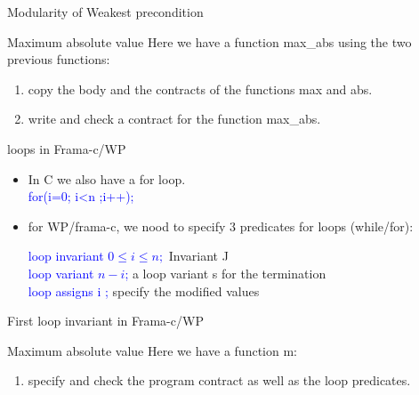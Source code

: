 \begin{frame}{Modularity of Weakest precondition}
\begin{exampleblock}{Maximum absolute value}
	Here we have a function max\_abs using the two previous functions:
	
	\begin{enumerate}
		\item copy the body and the contracts of the functions max and abs.
		\item write and check a contract for the function max\_abs.
		
	\end{enumerate}
\end{exampleblock}
\end{frame}

\begin{frame}{loops in Frama-c/WP}
\begin{itemize}
	\item In C we also have a for loop.\\
	\textcolor{blue}{for(i=0; i<n ;i++);}
    \item for WP/frama-c, we nood to specify 3 predicates for loops (while/for):
    
    	 \textcolor{blue}{loop invariant $0 \leq i\leq n;$} Invariant J \\
    	 \textcolor{blue}{loop variant $n-i$;} a loop variant s for the termination\\
    	  \textcolor{blue}{loop assigns i ;} specify the modified values \\
  
\end{itemize}
\end{frame}


\begin{frame}{First loop invariant in Frama-c/WP}
\begin{exampleblock}{Maximum absolute value}
	Here we have a function m:
	
	\begin{enumerate}
		\item specify and check the program contract as well as the loop predicates.
	\end{enumerate}
\end{exampleblock}
\end{frame}

